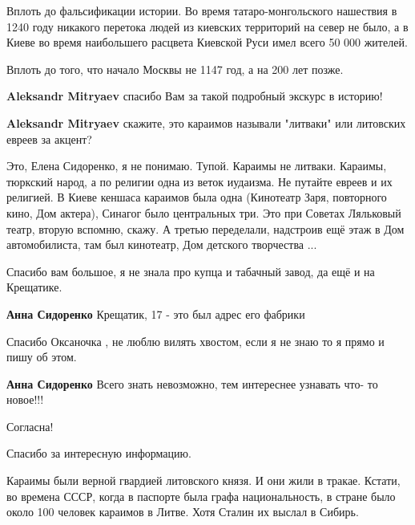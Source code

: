 \begin{itemize}
Вплоть до фальсификации истории. Во время татаро-монгольского нашествия в 1240
году никакого перетока людей из киевских территорий на север не было, а в Киеве
во время наибольшего расцвета Киевской Руси имел всего 50 000 жителей.

Вплоть до того, что начало Москвы не 1147 год, а на 200 лет позже.

\begin{itemize} %
\textbf{Aleksandr Mitryaev} спасибо Вам за такой подробный экскурс в историю!

\textbf{Aleksandr Mitryaev} скажите, это караимов называли "литваки" или литовских евреев за акцент?


Это, Елена Сидоренко, я не понимаю. Тупой. Караимы не литваки. Караимы, тюркский народ, а по религии одна из веток иудаизма. Не путайте евреев и их религией. В Киеве кеншаса караимов была одна (Кинотеатр Заря, повторного кино, Дом актера), Синагог было центральных три. Это при Советах Ляльковый театр, вторую вспомню, скажу. А третью переделали, надстроив ещё этаж в Дом автомобилиста, там был кинотеатр, Дом детского творчества ...
\end{itemize} %


Спасибо вам большое, я не знала про купца и табачный завод, да ещё и на
Крещатике.

\begin{itemize} %
\textbf{Анна Сидоренко} Крещатик, 17 - это был адрес его фабрики

Спасибо Оксаночка , не люблю вилять хвостом, если я не знаю то я прямо и пишу об этом.

\begin{itemize} %
\textbf{Анна Сидоренко} Всего знать невозможно, тем интереснее узнавать что- то новое!!!

Согласна!
\end{itemize} %

\end{itemize} %

Спасибо за интересную информацию.


Караимы были верной гвардией литовского князя. И они жили в тракае. Кстати, во
времена СССР, когда в паспорте была графа национальность, в стране было около
100 человек караимов в Литве. Хотя Сталин их выслал в Сибирь.


\end{itemize}
